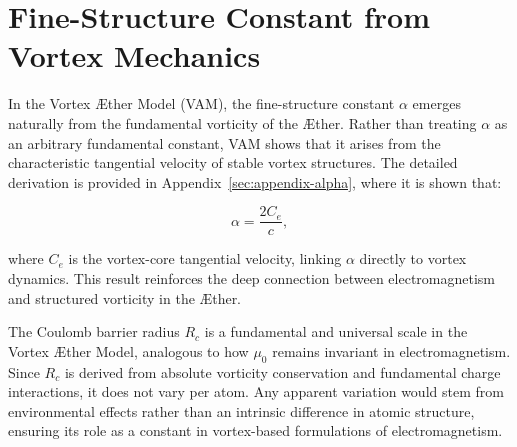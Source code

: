 

\section{Fine-Structure Constant from Vortex Mechanics}

In the Vortex \AE ther Model (VAM), the fine-structure constant $\alpha$ emerges naturally from the fundamental vorticity of the \AE ther. Rather than treating $\alpha$ as an arbitrary fundamental constant, VAM shows that it arises from the characteristic tangential velocity of stable vortex structures. The detailed derivation is provided in Appendix~\ref{sec:appendix-alpha}, where it is shown that:

\begin{equation}
    \alpha = \frac{2 C_e}{c},
\end{equation}

where $C_e$ is the vortex-core tangential velocity, linking $\alpha$ directly to vortex dynamics. This result reinforces the deep connection between electromagnetism and structured vorticity in the \AE ther.


The Coulomb barrier radius \(R_c\) is a fundamental and universal scale in the Vortex Æther Model, analogous to how \(\mu_0\) remains invariant in electromagnetism. Since \(R_c\) is derived from absolute vorticity conservation and fundamental charge interactions, it does not vary per atom. Any apparent variation would stem from environmental effects rather than an intrinsic difference in atomic structure, ensuring its role as a constant in vortex-based formulations of electromagnetism.

